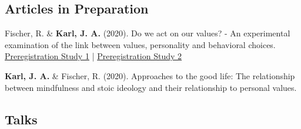 \documentclass[11pt]{article} %
\begin{document}
\subsection*{Articles in Preparation}

\begin{hangparas}{2em}{1}

Fischer, R. \&  \textbf{Karl, J. A.} (2020). Do we act on our values? - An experimental examination of the link between values, personality and behavioral choices. \href{https://osf.io/nz8ak/?view_only=b9110537370444d98d2b22dcf5f0774e}{Preregistration Study 1} | \href{https://osf.io/4juxx/?view_only=a4f0b53183824c56a90310497195d2d7}{Preregistration Study 2}

\textbf{Karl, J. A.} \& Fischer, R. (2020). Approaches to the good life: The relationship between mindfulness and stoic ideology and their relationship to personal values. 

\end{hangparas}

\subsection*{Talks}
\end{document}
